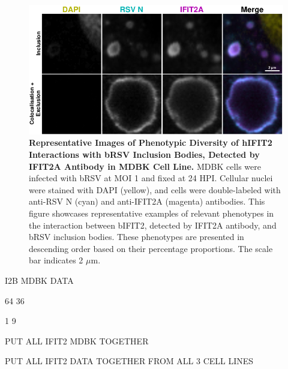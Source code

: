 \begin{figure}
    \centering
    \includegraphics[width=1\linewidth]{08. Chapter 3/Figs/02. Infection/02. IFIT2/01. IFIT2A/15. i2a mdbk brsv.pdf} 
    \caption[Representative Images of Phenotypic Diversity of hIFIT2 Interactions with bRSV Inclusion Bodies, Detected by IFIT2A Antibody in MDBK Cell Line.]{\textbf{Representative Images of Phenotypic Diversity of hIFIT2 Interactions with bRSV Inclusion Bodies, Detected by IFIT2A Antibody in MDBK Cell Line.} MDBK cells were infected with bRSV at MOI 1 and fixed at 24 HPI. Cellular nuclei were stained with DAPI (yellow), and cells were double-labeled with anti-RSV N (cyan) and anti-IFIT2A (magenta) antibodies. This figure showcases representative examples of relevant phenotypes in the interaction between bIFIT2, detected by IFIT2A antibody, and bRSV inclusion bodies. These phenotypes are presented in descending order based on their percentage proportions. The scale bar indicates 2 \(\mu \mbox{m}\).}
    \label{fig:Representative Images of Phenotypic Diversity of hIFIT2 Interactions with bRSV Inclusion Bodies, Detected by IFIT2A Antibody in MDBK Cell Line}
\end{figure}

I2B MDBK DATA

64 36

1 9

PUT ALL IFIT2 MDBK TOGETHER 

PUT ALL IFIT2 DATA TOGETHER FROM ALL 3 CELL LINES

